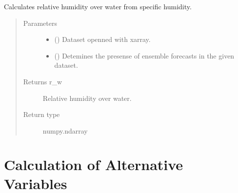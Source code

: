 \documentclass[a4paper,11pt,english]{sphinxmanual}
\begin{document}
\begin{fulllineitems}
\label{\detokenize{modules:envlib.contrail.get_rw_from_specific_hum}}
Calculates relative humidity over water from specific humidity.
\begin{quote}\begin{description}
\item[{Parameters}] \leavevmode\begin{itemize}
\item {} 
 () \textendash{} Dataset openned with xarray.

\item {} 
 () \textendash{} Detemines the presense of ensemble forecasts in the given dataset.

\end{itemize}

\item[{Returns r\_w}] \leavevmode
Relative humidity over water.

\item[{Return type}] \leavevmode
numpy.ndarray

\end{description}\end{quote}

\end{fulllineitems}



\section{Calculation of Alternative Variables}
\label{\detokenize{modules:module-envlib.calc_altrv_vars}}\label{\detokenize{modules:calculation-of-alternative-variables}}
\end{document}
